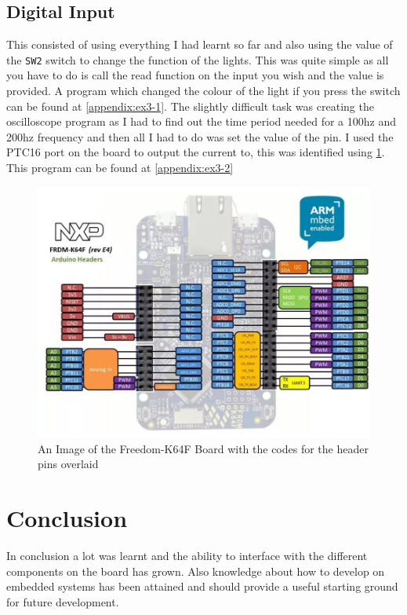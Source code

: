 \documentclass[a4paper,12pt]{scrartcl}
\begin{document}
{		\subsection{Digital Input}
		{
			This consisted of using everything I had learnt so far and also using the value of the \lstinline|SW2| switch to change the function of the lights. This was quite simple as all you have to do is call the read function on the input you wish and the value is provided. A program which changed the colour of the light if you press the switch can be found at \cref{appendix:ex3-1}. The slightly difficult task was creating the oscilloscope program as I had to find out the time period needed for a 100hz and 200hz frequency and then all I had to do was set the value of the pin. I used the PTC16 port on the board to output the current to, this was identified using \cref{img:FRDM-K64F-HEADERPINS}. This program can be found at \cref{appendix:ex3-2}
			\begin{figure}
				\centering
				\includegraphics[width=\textwidth]{frdm_k64f_reve4_header_pinout}
				\caption{An Image of the Freedom-K64F Board with the codes for the header pins overlaid\cite{armlimited2015}}
				\label{img:FRDM-K64F-HEADERPINS}
			\end{figure}
		}
	}

	\section{Conclusion}
	{
		In conclusion a lot was learnt and the ability to interface with the different components on the board has grown. Also knowledge about how to develop on embedded systems has been attained and should provide a useful starting ground for future development.
	}
	
	\newpage
	
	\printbibliography[heading=bibintoc,title=References]
\end{document}
